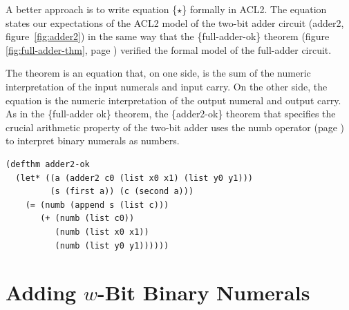 A better approach is to write equation \{$\star$\}
formally in ACL2. The equation states our expectations of
the ACL2 model of the
two-bit adder circuit (\textsf{adder2}, figure~\ref{fig:adder2})
in the same way that the \{full-adder-ok\} theorem
(figure \ref{fig:full-adder-thm}, page \pageref{fig:full-adder-thm})
verified the formal model of the full-adder circuit.

The theorem is an equation that, on one side, is the
sum of the numeric interpretation of the input numerals
and input carry. On the other side, the equation is
the numeric interpretation of the output numeral
and output carry.
As in the \{full-adder ok\} theorem,
the \{adder2-ok\} theorem that specifies
the crucial arithmetic property of the two-bit adder
uses the \textsf{numb} operator (page \pageref{nmb-defun})
to interpret binary numerals as numbers.

\label{adder2-ok}
\begin{code}
\begin{verbatim}
(defthm adder2-ok
  (let* ((a (adder2 c0 (list x0 x1) (list y0 y1)))
         (s (first a)) (c (second a)))
    (= (numb (append s (list c)))
       (+ (numb (list c0))
          (numb (list x0 x1))
          (numb (list y0 y1))))))
\end{verbatim}
\end{code}

\begin{exercises}


\end{exercises}

\section{Adding $w$-Bit Binary Numerals}
\label{sec:adding-w-bit-numerals}

